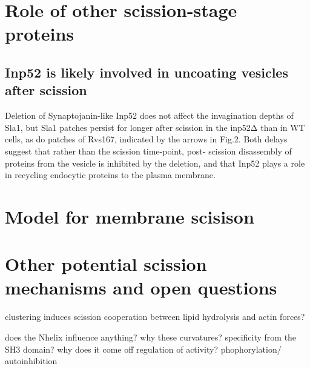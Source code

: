 \section{Role of other scission-stage proteins}
\subsection{Inp52 is likely involved in uncoating vesicles after scission}
Deletion of Synaptojanin-like Inp52 does not affect the invagination depths of Sla1, but Sla1 patches persist for longer after scission in the inp52Δ than in WT cells, as do patches of Rvs167, indicated by the arrows in Fig.2. Both delays suggest that rather than the scission time-point, post- scission disassembly of proteins from the vesicle is inhibited by the deletion, and that Inp52 plays a role in recycling endocytic proteins to the plasma membrane.


\section{Model for membrane scisison}


\section{Other potential scission mechanisms and open questions}

clustering induces scission 
cooperation between lipid hydrolysis and actin forces?


does the Nhelix influence anything?
why these curvatures? specificity from the SH3 domain?
why does it come off
regulation of activity? phophorylation/ autoinhibition
